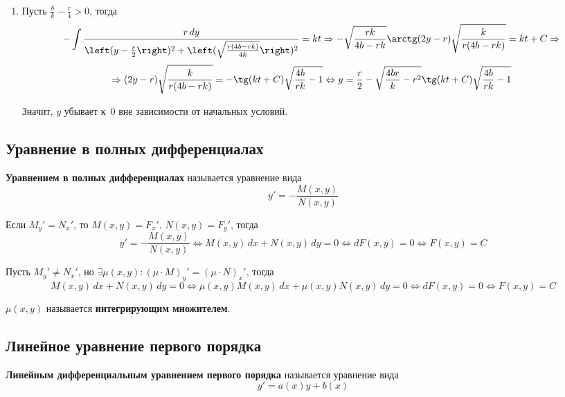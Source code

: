\begin{enumerate}
	\item Пусть $\frac{b}k - \frac{r}4 > 0$, тогда
	\begin{equation*}
	-\int \frac{r\,dy}{\left( y - \frac{r}2 \right)^2 + \left( \sqrt\frac{r(4b - rk)}{4k} \right)^2} = kt \Rightarrow
	-\sqrt\frac{rk}{4b - rk} \arctg (2y - r)\sqrt\frac{k}{r(4b - rk)} = kt + C \Rightarrow
	\end{equation*}
	\begin{equation*}
	\Rightarrow (2y - r)\sqrt\frac{k}{r(4b - rk)} = -\tg (kt + C) \sqrt{\frac{4b}{rk} - 1} \Leftrightarrow
	y = \frac{r}2 - \sqrt{\frac{4br}{k} - r^2}\tg (kt + C) \sqrt{\frac{4b}{rk} - 1}
	\end{equation*}
	
	Значит, $y$ убывает к~$0$ вне зависимости от начальных условий.
\end{enumerate}

\subsection{Уравнение в полных дифференциалах}
 \textbf{Уравнением в полных дифференциалах} называется уравнение вида
\begin{equation*}
y' = -\frac{M(x, y)}{N(x, y)}
\end{equation*}

Если $M_y' = N_x'$, то $M(x, y) = F_x'$, $N(x, y) = F_y'$, тогда
\begin{equation*}
y' = -\frac{M(x, y)}{N(x, y)} \Leftrightarrow
M(x, y)\,dx + N(x, y)\,dy = 0 \Leftrightarrow
dF(x, y) = 0 \Leftrightarrow
F(x, y) = C
\end{equation*}

Пусть $M_y' \neq N_x'$, но $\exists \mu(x, y) \colon (\mu \cdot M)_y' = (\mu \cdot N)_x'$, тогда
\begin{equation*}
M(x, y)\,dx + N(x, y)\,dy = 0 \Leftrightarrow
\mu(x, y) M(x, y)\,dx + \mu(x, y) N(x, y)\,dy = 0 \Leftrightarrow
dF(x, y) = 0 \Leftrightarrow
F(x, y) = C
\end{equation*}

 $\mu(x, y)$ называется \textbf{интегрирующим множителем}.

\subsection{Линейное уравнение первого порядка}
 \textbf{Линейным дифференциальным уравнением первого порядка} называется уравнение вида
\begin{equation*}
y' = a(x) y + b(x)
\end{equation*}

